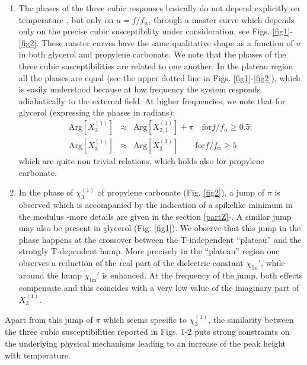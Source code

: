 \documentclass[single column,pre]{revtex4}
\begin{document}
\begin{enumerate}
\item The phases of the three cubic responses basically do not depend explicitly on temperature \cite{Cra10,Bru11}, but only on $u=f/f_{\alpha}$, through
a master curve which depends only on the precise cubic susceptibility under consideration, see Figs. \ref{fig1}-\ref{fig2}. These master curves have the same qualitative shape as a function of $u$ in both glycerol and propylene carbonate. We note that the phases of the three cubic susceptibilities are related to one another. In the plateau region all the phases are equal (see the upper dotted line in Figs. \ref{fig1}-\ref{fig2}), which is easily understood because at low frequency the system responds adiabatically to the external field. At higher frequencies,  
we note that for glycerol (expressing the phases in radians):
\begin{eqnarray}
\mathrm{Arg} \left[ X_{3}^{(1)} \right] & \approx & \mathrm{Arg} \left[ X_{2,1}^{(1)} \right]+\pi \quad \mathrm{for} f/f_{\alpha} \ge 0.5;  \label{eq20} \\
\mathrm{Arg} \left[ X_{3}^{(1)} \right] & \approx & \mathrm{Arg} \left[ X_{3}^{(3)} \right] \qquad \mathrm{for} f/f_{\alpha} \ge 5  \label{eq21} 
\end{eqnarray}
which are quite non trivial relations, which holds also for propylene carbonate. 


\item In the phase of $\chi_3^{(1)}$ of propylene carbonate (Fig. \ref{fig2}), a jump of $\pi$ is  observed which is accompanied by the indication of a spikelike minimum in the modulus -more details are given in the section \ref{partZ}-. A similar jump may also be present in glycerol (Fig. \ref{fig1}). We observe that this jump in the phase happens at the crossover between the T-independent ``plateau''  and the strongly T-dependent hump. More precisely in the ``plateau'' region one observes a reduction of the real part of the dielectric constant $\chi_{\text{lin}}'$, while around the hump $\chi_{\text{lin}}'$ is enhanced. At the frequency of the jump, both effects compensate and this coincides with a very low value of the imaginary part of $X_{3}^{(1)}$.
\end{enumerate}

Apart from this jump of $\pi$ which seems specific to $\chi_3^{(1)}$, the similarity between the three cubic susceptibilities reported in Figs. 1-2 puts strong constraints on the underlying physical mechanisms leading to an increase of the peak height with temperature.  
\end{document}
